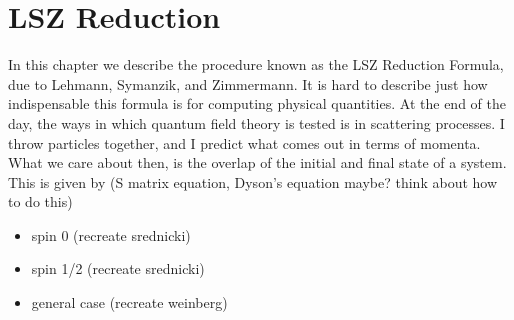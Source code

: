 \documentclass[main.tex]{subfiles}
\begin{document}
\chapter{LSZ Reduction}
In this chapter we describe the procedure known as the LSZ Reduction Formula, due to Lehmann, Symanzik, and Zimmermann. It is hard to describe just how indispensable this formula is for computing physical quantities. At the end of the day, the ways in which quantum field theory is tested is in scattering processes. I throw particles together, and I predict what comes out in terms of momenta. What we care about then, is the overlap of the initial and final state of a system. This is given by (S matrix equation, Dyson's equation maybe? think about how to do this)

\begin{itemize}
\item spin 0 (recreate srednicki)
\item spin 1/2 (recreate srednicki)
\item general case (recreate weinberg)
\end{itemize}
\end{document}
